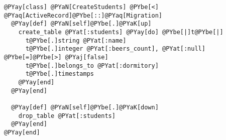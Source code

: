 \begin{Verbatim}[commandchars=@\[\]]
@PYay[class] @PYaN[CreateStudents] @PYbe[<] @PYaq[ActiveRecord]@PYbe[::]@PYaq[Migration]
  @PYay[def] @PYaN[self]@PYbe[.]@PYaK[up]
    create_table @PYat[:students] @PYay[do] @PYbe[|]t@PYbe[|]
      t@PYbe[.]string @PYat[:name]
      t@PYbe[.]integer @PYat[:beers_count], @PYat[:null] @PYbe[=]@PYbe[>] @PYaj[false]
      t@PYbe[.]belongs_to @PYat[:dormitory]
      t@PYbe[.]timestamps
    @PYay[end]
  @PYay[end]

  @PYay[def] @PYaN[self]@PYbe[.]@PYaK[down]
    drop_table @PYat[:students]
  @PYay[end]
@PYay[end]
\end{Verbatim}

